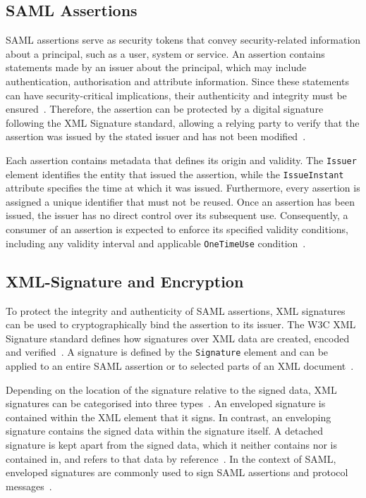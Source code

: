 \documentclass[../main.tex]{subfiles}
\begin{document}
\subsection{SAML Assertions}\label{subsec:assertions}

SAML assertions serve as security tokens that convey security-related information about a principal, 
such as a user, system or service. 
An assertion contains statements made by an issuer about the principal, which may include authentication, 
authorisation and attribute information. 
Since these statements can have security-critical implications, their authenticity and integrity must be 
ensured~\cite{SAMLAssertions}. 
Therefore, the assertion can be protected by a digital signature following the XML Signature standard, 
allowing a relying party to verify that the assertion was issued by the stated issuer and has not been 
modified~\cite{BreakingSAML}. 

Each assertion contains metadata that defines its origin and validity. 
The \texttt{Issuer} element identifies the entity that issued the assertion, while the \texttt{IssueInstant} 
attribute specifies the time at which it was issued. 
Furthermore, every assertion is assigned a unique identifier that must not be reused. 
Once an assertion has been issued, the issuer has no direct control over its subsequent use. 
Consequently, a consumer of an assertion is expected to enforce its specified validity conditions, 
including any validity interval and applicable \texttt{OneTimeUse} condition~\cite{SAMLAssertions}.

\subsection{XML-Signature and Encryption}\label{subsec:xml-sig-enc}

To protect the integrity and authenticity of SAML assertions, XML signatures can be used to 
cryptographically bind the assertion to its issuer. 
The W3C XML Signature standard defines how signatures over XML data are created, encoded and 
verified~\cite{W3CXMLSIG}. 
A signature is defined by the \texttt{Signature} element and can be applied to an entire SAML assertion 
or to selected parts of an XML document~\cite{SAMLAssertions,BreakingSAML}. 

Depending on the location of the signature relative to the signed data, XML signatures can be categorised 
into three types~\cite{W3CXMLSIG}. 
An enveloped signature is contained within the XML element that it signs. 
In contrast, an enveloping signature contains the signed data within the signature itself. 
A detached signature is kept apart from the signed data, which it neither contains nor is contained 
in, and refers to that data by reference~\cite{W3CXMLSIG}. 
In the context of SAML, enveloped signatures are commonly used to sign SAML assertions and protocol 
messages~\cite{SAMLAssertions}.
\end{document}
